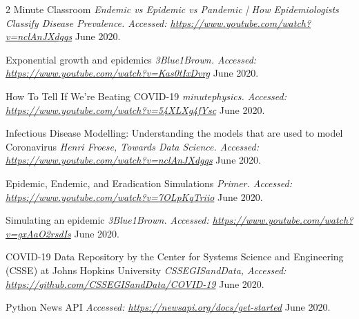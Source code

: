 \let\cleardoublepage\clearpage
\cleardoublepage
{}


\begin{thebibliography}{1}
\vspace*{15pt}

 2 Minute Classroom {\em Endemic vs Epidemic vs Pandemic | How Epidemiologists Classify Disease Prevalence. Accessed:  \url{https://www.youtube.com/watch?v=nclAnJXdgqs}} June 2020.

 Exponential growth and epidemics {\em 3Blue1Brown. Accessed:  \url{https://www.youtube.com/watch?v=Kas0tIxDvrg}} June 2020.

 How To Tell If We're Beating COVID-19 {\em 
minutephysics. Accessed:  \url{https://www.youtube.com/watch?v=54XLXg4fYsc}} June 2020.

 Infectious Disease Modelling: Understanding the models that are used to model Coronavirus {\em Henri Froese, Towards Data Science. Accessed:  \url{https://www.youtube.com/watch?v=nclAnJXdgqs}} June 2020.

 Epidemic, Endemic, and Eradication Simulations {\em Primer. Accessed:  \url{https://www.youtube.com/watch?v=7OLpKqTriio}} June 2020.

 Simulating an epidemic {\em 3Blue1Brown. Accessed:  \url{https://www.youtube.com/watch?v=gxAaO2rsdIs}} June 2020.

 COVID-19 Data Repository by the Center for Systems Science and Engineering (CSSE) at Johns Hopkins University {\em CSSEGISandData, Accessed:  \url{https://github.com/CSSEGISandData/COVID-19}} June 2020.

 Python News API {\em Accessed:  \url{https://newsapi.org/docs/get-started}} June 2020.

\end{thebibliography}